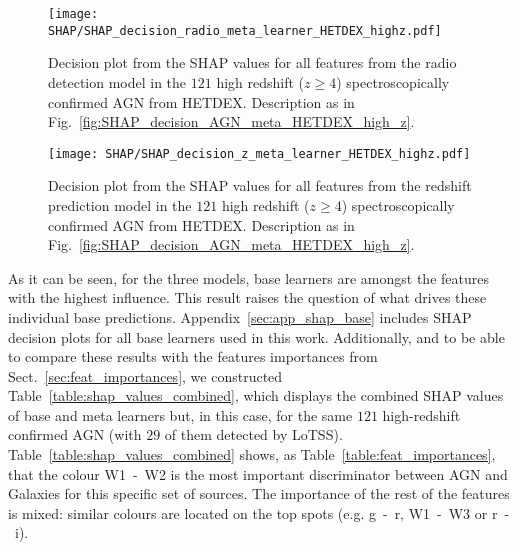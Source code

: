 \documentclass{aa}
\begin{document}
\begin{figure}
   \centering
   \begin{minipage}{0.70\columnwidth}
   \texttt{[image: SHAP/SHAP\_decision\_radio\_meta\_learner\_HETDEX\_highz.pdf]}
   \end{minipage}
   \caption{Decision plot from the SHAP values for all features from the radio detection model in the $121$ high redshift ($z \geq 4$) spectroscopically confirmed AGN from HETDEX. Description as in Fig.~\ref{fig:SHAP_decision_AGN_meta_HETDEX_high_z}.}
   \label{fig:SHAP_decision_radio_meta_HETDEX_high_z}
\end{figure}

\begin{figure}
   \centering
   \begin{minipage}{0.70\columnwidth}
   \texttt{[image: SHAP/SHAP\_decision\_z\_meta\_learner\_HETDEX\_highz.pdf]}
   \end{minipage}
   \caption{Decision plot from the SHAP values for all features from the redshift prediction model in the $121$ high redshift ($z \geq 4$) spectroscopically confirmed AGN from HETDEX. Description as in Fig.~\ref{fig:SHAP_decision_AGN_meta_HETDEX_high_z}.}
   \label{fig:SHAP_decision_z_meta_HETDEX_high_z}
\end{figure}

As it can be seen, for the three models, base learners are amongst the features with the highest influence. This result raises the question of what drives these individual base predictions. Appendix~\ref{sec:app_shap_base} includes SHAP decision plots for all base learners used in this work. Additionally, and to be able to compare these results with the features importances from Sect.~\ref{sec:feat_importances}, we constructed Table~\ref{table:shap_values_combined}, which displays the combined SHAP values of base and meta learners but, in this case, for the same $121$ high-redshift confirmed AGN (with $29$ of them detected by LoTSS). Table~\ref{table:shap_values_combined} shows, as Table~\ref{table:feat_importances}, that the colour W1~-~W2 is the most important discriminator between AGN and Galaxies for this specific set of sources. The importance of the rest of the features is mixed: similar colours are located on the top spots (e.g. g~-~r, W1~-~W3 or r~-~i).
\end{document}
